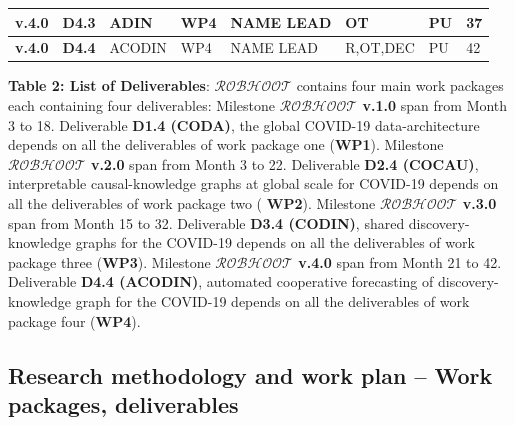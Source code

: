 \documentclass[11pt, a4paper]{article} %
\begin{document}
\begin{table}[h!]
\begin{center}
\begin{tabular}{|m{2cm} || m{1.25cm} || m{1.75cm} || m{1.5cm} || m{2.4cm} || m{1.7cm} || m{1.15cm} || m{1.7cm}|}
  \hline\hline
   \rowcolor{piggypink!80}
  {\bf v.4.0} & {\bf D4.3} & ADIN & WP4 & NAME LEAD & OT & PU & 37 \\
  \hline\hline
  \rowcolor{piggypink!80}
  {\bf v.4.0} & {\bf D4.4} & ACODIN & WP4 & NAME LEAD & R,OT,DEC & PU & 42 \\
\hline\hline
  \end{tabular}
\end{center} {{\bf Table 2: List of Deliverables}: {\bf
    $\mathcal{ROBHOOT}$} contains four main work packages each
  containing four deliverables: Milestone {\bf $\mathcal{ROBHOOT}$
    v.1.0} span from Month 3 to 18. Deliverable {\bf D1.4 (CODA)}, the
  global COVID-19 data-architecture depends on all the deliverables of
  work package one ({\bf WP1}). Milestone {\bf $\mathcal{ROBHOOT}$
    v.2.0} span from Month 3 to 22. Deliverable {\bf D2.4 (COCAU)},
  interpretable causal-knowledge graphs at global scale for COVID-19
  depends on all the deliverables of work package two ({\bf
    WP2}). Milestone {\bf $\mathcal{ROBHOOT}$ v.3.0} span from Month
  15 to 32. Deliverable {\bf D3.4 (CODIN)}, shared discovery-knowledge
  graphs for the COVID-19 depends on all the deliverables of work
  package three ({\bf WP3}).  Milestone {\bf $\mathcal{ROBHOOT}$
    v.4.0} span from Month 21 to 42. Deliverable {\bf D4.4 (ACODIN)},
  automated cooperative forecasting of discovery-knowledge graph for
  the COVID-19 depends on all the deliverables of work package four
  ({\bf WP4}).}
\end{table}

  
\subsection{Research methodology and work plan – Work packages,
  deliverables}

\begin{itemize}


\end{itemize}
\end{document}
